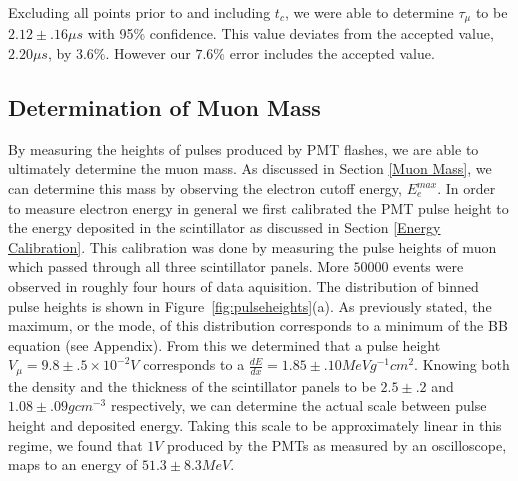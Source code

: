Excluding all points prior to and including $t_{c}$, we were able to determine $\tau_{\mu}$ to be $2.12 \pm .16 \mu s$ with 95\% confidence.  This value deviates from the accepted value, $2.20\mu s$, by $3.6\%$.  However our $7.6\%$ error includes the accepted value.






\subsection{Determination of Muon Mass}

By measuring the heights of pulses produced by PMT flashes, we are
able to ultimately determine the muon mass.  As discussed in Section
\ref{Muon Mass}, we can determine this mass by observing the electron cutoff energy, $E_{e}^{max}$. In order to measure electron energy in general
we first calibrated the PMT pulse height to the energy deposited in
the scintillator as discussed in Section \ref{Energy Calibration}. This calibration
was done by measuring the pulse heights of muon which passed through
all three scintillator panels.  More $50000$ events were observed in
roughly four hours of data aquisition.  The distribution of binned
pulse heights is shown in Figure~\ref{fig:pulseheights}(a).  As previously stated, the
maximum, or the mode, of this distribution corresponds to a minimum of
the BB equation (see Appendix).  From this we determined that a pulse
height $V_{\mu} = 9.8\pm.5 \times 10^{-2} V$ corresponds to a $\frac{dE}{dx}= 1.85\pm.10 MeV
g^{-1} cm^{2}$.  Knowing both the density and the thickness of the
scintillator panels to be $2.5\pm.2$ and $1.08\pm.09 g cm^{-3}$ respectively, we can determine
the actual scale between pulse height and deposited energy.  Taking
this scale to be approximately linear in this regime, we found that
$1V$ produced by the PMTs as measured by an oscilloscope, maps to an
energy of $51.3 \pm 8.3 MeV$.



